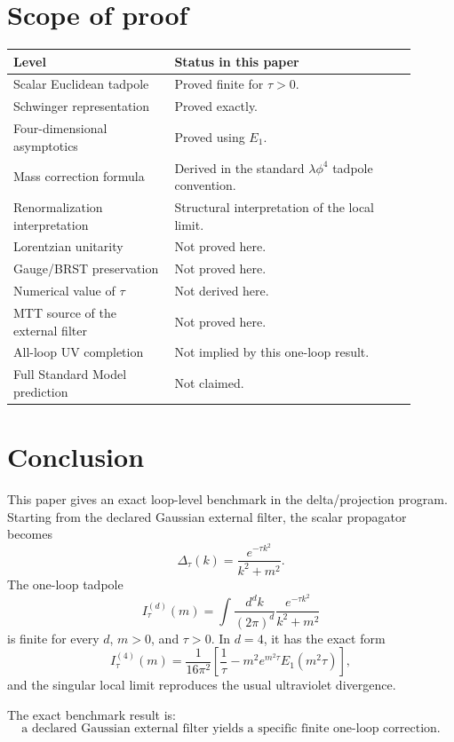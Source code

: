 \documentclass[11pt]{article}
\begin{document}
\section{Scope of proof}

\begin{center}
\begin{tabular}{p{0.36\linewidth}p{0.54\linewidth}}
\hline
\textbf{Level} & \textbf{Status in this paper}\\
\hline
Scalar Euclidean tadpole & Proved finite for \(\tau>0\).\\
Schwinger representation & Proved exactly.\\
Four-dimensional asymptotics & Proved using \(E_1\).\\
Mass correction formula & Derived in the standard \(\lambda\phi^4\) tadpole convention.\\
Renormalization interpretation & Structural interpretation of the local limit.\\
Lorentzian unitarity & Not proved here.\\
Gauge/BRST preservation & Not proved here.\\
Numerical value of \(\tau\) & Not derived here.\\
MTT source of the external filter & Not proved here.\\
All-loop UV completion & Not implied by this one-loop result.\\
Full Standard Model prediction & Not claimed.\\
\hline
\end{tabular}
\end{center}

\section{Conclusion}

This paper gives an exact loop-level benchmark in the delta/projection program.  Starting
from the declared Gaussian external filter, the scalar propagator becomes
\[
\Delta_\tau(k)=\frac{e^{-\tau k^2}}{k^2+m^2}.
\]
The one-loop tadpole
\[
I_\tau^{(d)}(m)
=
\int\frac{d^d k}{(2\pi)^d}
\frac{e^{-\tau k^2}}{k^2+m^2}
\]
is finite for every \(d\), \(m>0\), and \(\tau>0\). In \(d=4\), it has the exact form
\[
I_\tau^{(4)}(m)
=
\frac{1}{16\pi^2}
\left[
\frac{1}{\tau}
-
m^2e^{m^2\tau}E_1(m^2\tau)
\right],
\]
and the singular local limit reproduces the usual ultraviolet divergence.

The exact benchmark result is:
\[
\boxed{
\text{a declared Gaussian external filter yields a specific finite one-loop correction.}
}
\]
\end{document}
